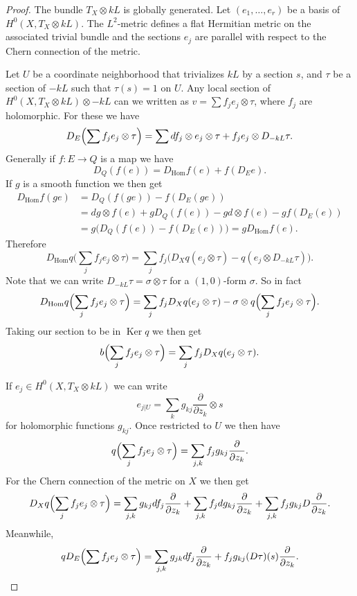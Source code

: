 \documentclass[12pt]{amsart}
\theoremstyle{definition}
\DeclareMathOperator{\Ker}{Ker}
\DeclareMathOperator{\Hom}{Hom}
\begin{document}
\begin{proof}
The bundle $T_X \otimes kL$ is globally generated.
Let $(e_1, \ldots, e_r)$ be a basis of $H^0(X,T_X \otimes kL)$.
The $L^2$-metric defines a flat Hermitian metric on the associated trivial bundle and the sections $e_j$ are parallel with respect to the Chern connection of the metric.

Let $U$ be a coordinate neighborhood that trivializes $kL$ by a section $s$, and $\tau$ be a section of $-kL$ such that $\tau(s) = 1$ on $U$.
Any local section of $H^0(X, T_X \otimes kL) \otimes -kL$ can we written as $v = \sum f_j e_j \otimes \tau$, where $f_j$ are holomorphic.
For these we have
\[
D_E\Bigl( \sum f_j e_j \otimes \tau \Bigr)
= \sum d f_j \otimes e_j \otimes \tau + f_j e_j \otimes D_{-kL} \tau.
\]
Generally if $f : E \to Q$ is a map we have
\[
D_Q(f(e))
= D_{\Hom}f(e) + f(D_E e).
\]
If $g$ is a smooth function we then get
\begin{align*}
D_{\Hom}f(ge)
&= D_Q(f(ge)) - f(D_E(ge))
\\
&= dg \otimes f(e) + g D_Q(f(e)) - gd \otimes f(e) - g f(D_E(e))
\\
&= g \bigl( D_Q(f(e)) - f(D_E(e)) \bigr)
= g D_{\Hom} f(e).
\end{align*}
Therefore
\[
D_{\Hom}q \biggl( \sum_j f_j e_j \otimes \tau \biggr)
= \sum_j f_j \bigl( D_X q(e_j \otimes \tau)
- q(e_j \otimes D_{-kL}\tau) \bigr).
\]
Note that we can write $D_{-kL}\tau = \sigma \otimes \tau$ for a $(1,0)$-form $\sigma$.
So in fact
\[
D_{\Hom}q \Bigl( \sum_j f_j e_j \otimes \tau \Bigr)
= \sum_j f_j D_X q(e_j \otimes \tau)
- \sigma \otimes q\Bigl(\sum_j f_j e_j \otimes \tau\Bigr).
\]
Taking our section to be in $\Ker q$ we then get
\[
b\Bigl( \sum_j f_j e_j \otimes \tau \Bigr)
= \sum_j f_j D_X q(e_j \otimes \tau).
\]



If $e_j \in H^0(X,T_X \otimes kL)$ we can write
\[
e_{j|U} = \sum_k g_{kj} \frac{\partial}{\partial z_k} \otimes s
\]
for holomorphic functions $g_{kj}$.
Once restricted to $U$ we then have
\[
q\Bigl(\sum_{j} f_j e_{j} \otimes \tau \Bigr) 
= \sum_{j,k} f_j g_{kj} \frac{\partial}{\partial z_k}.
\]
For the Chern connection of the metric on $X$ we then get
\[
D_X q\Bigl(\sum_{j} f_j e_{j} \otimes \tau \Bigr) 
= \sum_{j,k} g_{kj} df_j \frac{\partial}{\partial z_k}
+ \sum_{j,k} f_j dg_{kj} \frac{\partial}{\partial z_k}
+ \sum_{j,k} f_j g_{kj} D\frac{\partial}{\partial z_k}.
\]
Meanwhile,
\[
q D_E\Bigl( \sum f_j e_j \otimes \tau \Bigr)
= \sum_{j,k} g_{jk} d f_j \frac{\partial}{\partial z_k}
+ f_j g_{kj} (D \tau)(s) \frac{\partial}{\partial z_k} .
\]



\end{proof}
\end{document}
